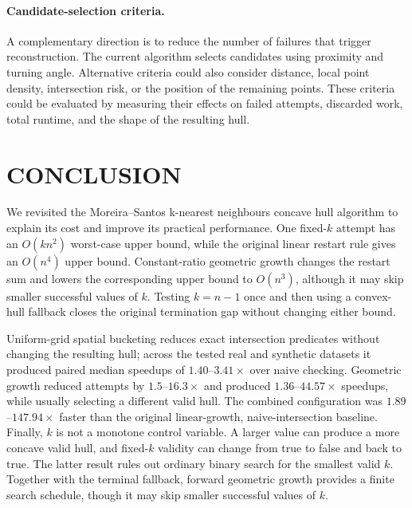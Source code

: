 \documentclass[a4paper,twoside]{article}
\begin{document}
\paragraph{Candidate-selection criteria.}
A complementary direction is to reduce the number of failures that trigger
reconstruction. The current algorithm selects candidates using proximity and
turning angle. Alternative criteria could also consider distance, local point
density, intersection risk, or the position of the remaining points. These
criteria could be evaluated by measuring their effects on failed attempts,
discarded work, total runtime, and the shape of the resulting hull.
\section{\uppercase{Conclusion}}
We revisited the Moreira--Santos k-nearest neighbours concave hull algorithm to
explain its cost and improve its practical performance. One fixed-$k$ attempt has
an $O(kn^2)$ worst-case upper bound, while the original linear restart rule gives
an $O(n^4)$ upper bound. Constant-ratio geometric growth changes the restart sum
and lowers the corresponding upper bound to $O(n^3)$, although it may skip smaller
successful values of $k$. Testing $k=n-1$ once and then using a convex-hull
fallback closes the original termination gap without changing either bound.

Uniform-grid spatial bucketing reduces exact intersection predicates without
changing the resulting hull; across the tested real and synthetic datasets it
produced paired median speedups of $1.40$--$3.41\times$ over naive checking.
Geometric growth reduced attempts by $1.5$--$16.3\times$ and produced
$1.36$--$44.57\times$ speedups, while usually selecting a different valid hull.
The combined configuration was $1.89$--$147.94\times$ faster than the original
linear-growth, naive-intersection baseline.
Finally, $k$ is not a monotone control variable. A larger value can produce a
more concave valid hull, and fixed-$k$ validity can change from true to false and
back to true. The latter result rules out ordinary binary search for the smallest
valid $k$. Together with the terminal fallback, forward geometric growth provides
a finite search schedule, though it may skip smaller successful values of $k$.

{\small
}
\end{document}
